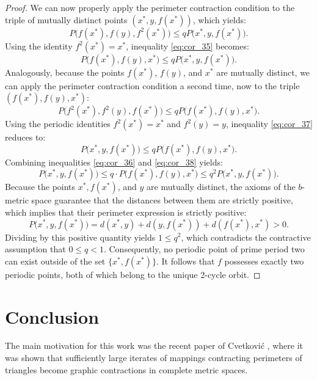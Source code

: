 \documentclass[a4paper,12pt,oneside]{article}
\numberwithin{equation}{section}
\begin{document}
\begin{proof}
We can now properly apply the perimeter contraction condition to the triple of mutually distinct points $(x^{*},y,f(x^{*}))$, which yields:
\begin{equation}
P\big(f(x^{*}),f(y),f^{2}(x^{*})\big)\leq q P\big(x^{*},y,f(x^{*})\big).
\label{eq:cor_35}
\end{equation}
Using the identity $f^{2}(x^{*}) = x^{*}$, inequality \eqref{eq:cor_35} becomes:
\begin{equation}
P\big(f(x^{*}),f(y),x^{*}\big)\leq q P\big(x^{*},y,f(x^{*})\big).
\label{eq:cor_36}
\end{equation}
Analogously, because the points $f(x^{*})$, $f(y)$, and $x^{*}$ are mutually distinct, we can apply the perimeter contraction condition a second time, now to the triple $(f(x^{*}),f(y),x^{*})$:
\begin{equation}
P\big(f^{2}(x^{*}),f^{2}(y),f(x^{*})\big)\leq q P\big(f(x^{*}),f(y),x^{*}\big).
\label{eq:cor_37}
\end{equation}
Using the periodic identities $f^{2}(x^{*}) = x^{*}$ and $f^{2}(y) = y$, inequality \eqref{eq:cor_37} reduces to:
\begin{equation}
P\big(x^{*},y,f(x^{*})\big)\leq q P\big(f(x^{*}),f(y),x^{*}\big).
\label{eq:cor_38}
\end{equation}
Combining inequalities \eqref{eq:cor_36} and \eqref{eq:cor_38} yields:
\[
P\big(x^{*},y,f(x^{*})\big)\leq q\cdot P\big(f(x^{*}),f(y),x^{*}\big)\leq q^{2}P\big(x^{*},y,f(x^{*})\big).
\]
Because the points $x^{*},f(x^{*})$, and $y$ are mutually distinct, the axioms of the $b$-metric space guarantee that the distances between them are strictly positive, which implies that their perimeter expression is strictly positive:
\[
P\big(x^{*},y,f(x^{*})\big) = d(x^{*},y) + d(y,f(x^{*})) + d(f(x^{*}),x^{*}) > 0.
\]
Dividing by this positive quantity yields $1 \leq q^{2}$, which  contradicts the contractive assumption that $0\leq q<1$. Consequently, no periodic point of prime period two can exist outside of the set $\{x^{*},f(x^{*})\}$. It follows that $f$ possesses exactly two periodic points, both of which belong to the unique 2-cycle orbit.
\end{proof}

\section{Conclusion}
The main motivation for this work was the recent paper of Cvetković \cite{cvetkovic2026}, where it was shown that sufficiently large iterates of mappings contracting perimeters of triangles become graphic contractions in complete metric spaces.
\end{document}
